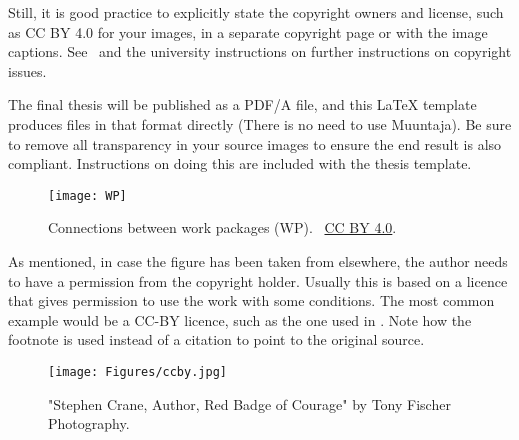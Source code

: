 Still, it is good practice to explicitly state the copyright owners and
license, such as CC BY 4.0 for your images, in a separate copyright page or with the image captions. See~ and the university instructions
on further instructions on copyright issues.

The final thesis will be published as a PDF/A file, and this LaTeX
template produces files in that format directly (There is no need to
use Muuntaja). Be sure to remove all transparency in your source
images to ensure the end result is also compliant. Instructions on doing this
are included with the thesis template.

\begin{figure}[ht]
  \begin{center}
    \texttt{[image: WP]}
  \end{center}
  \caption{Connections between work packages (WP). \copyrightstring\ \href{https://creativecommons.org/licenses/by/4.0/}{CC BY 4.0}.}
  \label{fig:work_packages}
\end{figure}

As mentioned, in case the figure has been taken from elsewhere, the author needs to have a permission from the copyright holder. Usually this is based on a licence that gives permission to use the work with some conditions. The most common example would be a CC-BY licence, such as the one used in . Note how the footnote is used instead of a citation to point to the original source. 

\begin{figure}[H]
  \begin{center}
    \texttt{[image: Figures/ccby.jpg]}
  \end{center}
    \caption[]{"Stephen Crane, Author, Red Badge of Courage" by Tony Fischer Photography\footnotemark.}
    \label{fig:ccbypic}
\end{figure}

